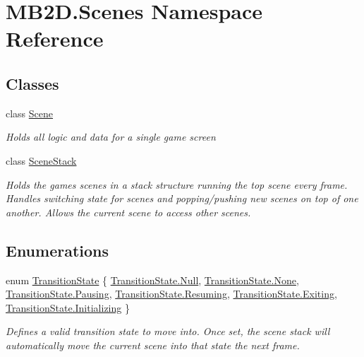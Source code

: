 \hypertarget{namespace_m_b2_d_1_1_scenes}{}\section{M\+B2\+D.\+Scenes Namespace Reference}
\label{namespace_m_b2_d_1_1_scenes}
\subsection*{Classes}
\begin{DoxyCompactItemize}
\item 
class \hyperlink{class_m_b2_d_1_1_scenes_1_1_scene}{Scene}
\begin{DoxyCompactList}\small\item\em Holds all logic and data for a single game screen \end{DoxyCompactList}\item 
class \hyperlink{class_m_b2_d_1_1_scenes_1_1_scene_stack}{Scene\+Stack}
\begin{DoxyCompactList}\small\item\em Holds the games scenes in a stack structure running the top scene every frame. Handles switching state for scenes and popping/pushing new scenes on top of one another. Allows the current scene to access other scenes. \end{DoxyCompactList}\end{DoxyCompactItemize}
\subsection*{Enumerations}
\begin{DoxyCompactItemize}
\item 
enum \hyperlink{namespace_m_b2_d_1_1_scenes_a0e0db3f97bbaa272f70534c5954c4acc}{Transition\+State} \{ \newline
\hyperlink{namespace_m_b2_d_1_1_scenes_a0e0db3f97bbaa272f70534c5954c4accabbb93ef26e3c101ff11cdd21cab08a94}{Transition\+State.\+Null}, 
\hyperlink{namespace_m_b2_d_1_1_scenes_a0e0db3f97bbaa272f70534c5954c4acca6adf97f83acf6453d4a6a4b1070f3754}{Transition\+State.\+None}, 
\hyperlink{namespace_m_b2_d_1_1_scenes_a0e0db3f97bbaa272f70534c5954c4accaf89bf2973f11fc8bac3db5669252725a}{Transition\+State.\+Pausing}, 
\hyperlink{namespace_m_b2_d_1_1_scenes_a0e0db3f97bbaa272f70534c5954c4acca69f55169cdb3caab27ba9f347bf05354}{Transition\+State.\+Resuming}, 
\newline
\hyperlink{namespace_m_b2_d_1_1_scenes_a0e0db3f97bbaa272f70534c5954c4acca0657d962b72e6f1f37dda8dad3684cb8}{Transition\+State.\+Exiting}, 
\hyperlink{namespace_m_b2_d_1_1_scenes_a0e0db3f97bbaa272f70534c5954c4acca32b169f72b293ef80d35435e9894f8e2}{Transition\+State.\+Initializing}
 \}\begin{DoxyCompactList}\small\item\em Defines a valid transition state to move into. Once set, the scene stack will automatically move the current scene into that state the next frame. \end{DoxyCompactList}
\end{DoxyCompactItemize}


